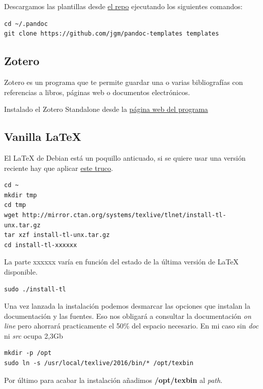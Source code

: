 \documentclass[12pt,spanish,]{article}
\begin{document}
Descargamos las plantillas desde
\href{https://github.com/jgm/pandoc-templates}{el repo} ejecutando los
siguientes comandos:

\begin{verbatim}
cd ~/.pandoc
git clone https://github.com/jgm/pandoc-templates templates
\end{verbatim}

\subsection{Zotero}\label{zotero}

Zotero es un programa que te permite guardar una o varias bibliografías
con referencias a libros, páginas web o documentos electrónicos.

Instalado el Zotero Standalone desde la
\href{https://www.zotero.org/}{página web del programa}

\subsection{Vanilla LaTeX}\label{vanilla-latex}

El LaTeX de Debian está un poquillo anticuado, si se quiere usar una
versión reciente hay que aplicar
\href{http://tex.stackexchange.com/questions/1092/how-to-install-vanilla-texlive-on-debian-or-ubuntu}{este
truco}.

\begin{verbatim}
cd ~
mkdir tmp
cd tmp
wget http://mirror.ctan.org/systems/texlive/tlnet/install-tl-unx.tar.gz
tar xzf install-tl-unx.tar.gz
cd install-tl-xxxxxx
\end{verbatim}

La parte xxxxxx varía en función del estado de la última versión de
LaTeX disponible.

\begin{verbatim}
sudo ./install-tl
\end{verbatim}

Una vez lanzada la instalación podemos desmarcar las opciones que
instalan la documentación y las fuentes. Eso nos obligará a consultar la
documentación \emph{on line} pero ahorrará practicamente el 50\% del
espacio necesario. En mi caso sin \emph{doc} ni \emph{src} ocupa 2,3Gb

\begin{verbatim}
mkdir -p /opt
sudo ln -s /usr/local/texlive/2016/bin/* /opt/texbin
\end{verbatim}

Por último para acabar la instalación añadimos \textbf{/opt/texbin} al
\emph{path}.
\end{document}
